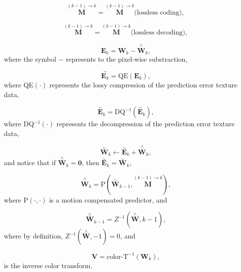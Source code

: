 \begin{equation}
  \overset{(k-1)\rightarrow k}{\mathbf M} = \overset{(k-1)\rightarrow k}{\mathbf M} \text{(lossless~coding)},
  \tag{d}
\end{equation}

\begin{equation}
  \overset{(k-1)\rightarrow k}{\mathbf M} = \overset{(k-1)\rightarrow k}{\mathbf M} \text{(lossless~decoding)},
  \tag{e}
\end{equation}

\begin{equation}
  {\mathbf E}_k = {\mathbf W}_k - \overset{\wedge}{{\mathbf W}}_k,
  \tag{f}
\end{equation}
where the symbol $-$ represents to the pixel-wise substraction,

\begin{equation}
  \overset{\sim}{{\mathbf E}_k} = \text{QE}({\mathbf E}_k),
  \tag{g}
\end{equation}
where QE$(\cdot)$ represents the lossy compression of the
prediction error texture data,

\begin{equation}
  \overset{\sim}{\mathbf E}_k = \text{DQ}^{-1}(\overset{\sim}{\mathbf E}_k),
  \tag{h}
\end{equation}
where DQ$^{-1}(\cdot)$ represents the decompression of the prediction
error texture data,

\begin{equation}
  \overset{\sim}{\mathbf W}_k \leftarrow \overset{\sim}{\mathbf E}_k + \overset{\wedge}{\mathbf W}_k,
  \tag{i}
\end{equation}
and notice that if $\overset{\wedge}{\mathbf W}_k = {\mathbf 0}$, then
$\overset{\sim}{\mathbf E}_k = \overset{\sim}{\mathbf W}_k$,

\begin{equation}
  \overset{\wedge}{\mathbf W}_k = \text{P}(\overset{\sim}{\mathbf W}_{k-1}, \overset{(k-1)\rightarrow k}{\mathbf M}),
  \tag{j}
\end{equation}
where P$(\cdot,\cdot)$ is a motion compensated predictor, and

\begin{equation}
   \overset{\wedge}{\mathbf W}_{k-1} = Z^{-1}(\overset{\wedge}{\mathbf W}, k-1),
  \tag{k}
\end{equation}
where by definition, $Z^{-1}(\overset{\wedge}{\mathbf W}, -1) = 0$, and

\begin{equation}
   {\mathbf V} = \text{color-T}^{-1}({\mathbf W}_k),
  \tag{l}
\end{equation}
is the inverse color transform.

